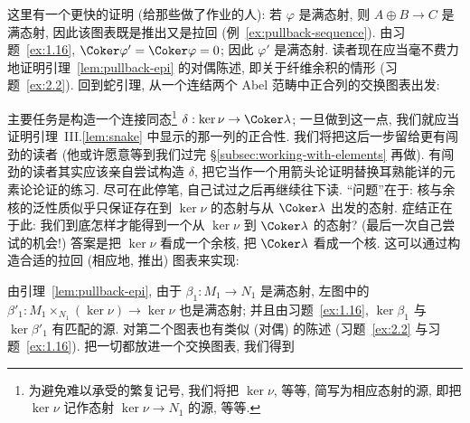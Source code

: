 \indent 这里有一个更快的证明 (给那些做了作业的人): 若 $\varphi$ 是满态射, 则 $A\oplus B\to C$ 是满态射, 因此该图表既是推出又是拉回 (例~\ref{ex:pullback-sequence}). 由习题~\ref{ex:1.16}, $\Coker\varphi'=\Coker\varphi=0$; 因此 $\varphi'$ 是满态射. 读者现在应当毫不费力地证明引理~\ref{lem:pullback-epi} 的对偶陈述, 即关于纤维余积的情形 (习题~\ref{ex:2.2}).
回到蛇引理, 从一个连结两个 Abel 范畴中正合列的交换图表出发:
\begin{center}
\end{center}
主要任务是构造一个连接同态\footnote{为避免难以承受的繁复记号, 我们将把 $\ker\nu$, 等等, 简写为相应态射的源, 即把 $\ker\nu$ 记作态射 $\ker\nu\to N_1$ 的源, 等等.} $\delta:\ker\nu\to\Coker\lambda$; 一旦做到这一点, 我们就应当证明引理~III.\ref{lem:snake} 中显示的那一列的正合性. 我们将把这后一步留给更有闯劲的读者 (他或许愿意等到我们过完 \S\ref{subsec:working-with-elements} 再做).
有闯劲的读者其实应该亲自尝试构造 $\delta$, 把它当作一个用箭头论证明替换耳熟能详的元素论论证的练习. 尽可在此停笔, 自己试过之后再继续往下读.
``问题''在于: 核与余核的泛性质似乎只保证存在到 $\ker\nu$ 的态射与从 $\Coker\lambda$ 出发的态射. 症结正在于此: 我们到底怎样才能得到一个从 $\ker\nu$ 到 $\Coker\lambda$ 的态射? (最后一次自己尝试的机会!)
\indent 答案是把 $\ker\nu$ 看成一个余核, 把 $\Coker\lambda$ 看成一个核. 这可以通过构造合适的拉回 (相应地, 推出) 图表来实现:
\begin{center}
\qquad\qquad
{}
\end{center}
由引理~\ref{lem:pullback-epi}, 由于 $\beta_1:M_1\to N_1$ 是满态射, 左图中的 $\beta'_1:M_1\times_{N_1}(\ker\nu)\to\ker\nu$ 也是满态射; 并且由习题~\ref{ex:1.16}, $\ker\beta_1$ 与 $\ker\beta'_1$ 有匹配的源. 对第二个图表也有类似 (对偶) 的陈述 (习题~\ref{ex:2.2} 与习题~\ref{ex:1.16}). 把一切都放进一个交换图表, 我们得到
